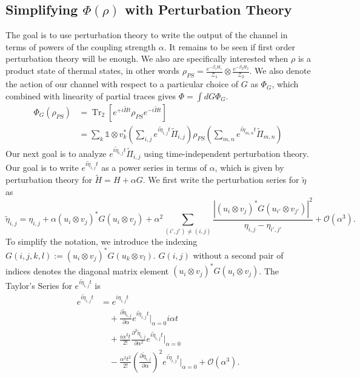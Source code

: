 \documentclass{article}
\newcommand{\parens}[1]{\left( #1 \right)}
\newcommand{\brackets}[1]{\left[ #1 \right]}
\newcommand{\abs}[1]{\left| #1 \right|}
\newcommand{\openone}{\mathds{1}}
\newcommand{\bigo}[1]{\mathcal{O}\left( #1 \right)}
\DeclareMathOperator{\Tr}{Tr}
\newcommand{\partrace}[2]{\Tr_{#1} \brackets{ #2 }}
\newcommand{\partfun}{\mathcal{Z}}
\begin{document}
\subsection{Simplifying $\Phi(\rho)$ with Perturbation Theory}
The goal is to use perturbation theory to write the output of the channel in terms of powers of the coupling strength $\alpha$. It remains to be seen if first order perturbation theory will be enough. We also are specifically interested when $\rho$ is a product state of thermal states, in other words $\rho_{PS} = \frac{e^{-\beta_1 H_1}}{\partfun_1} \otimes \frac{e^{-\beta_2 H_2}}{\partfun_2}$. We also denote the action of our channel with respect to a particular choice of $G$ as $\Phi_G$, which combined with linearity of partial traces gives $\Phi = \int dG \Phi_G$. 
\begin{align}
    \Phi_G(\rho_{PS}) &= \partrace{2}{e^{+i \widetilde{H} t} \rho_{PS} e^{-i \widetilde{H} t}} \\
    &= \sum_{k} \openone \otimes v_k^* \parens{\sum_{i, j} e^{i \widetilde{\eta}_{i, j} t} \widetilde{\Pi}_{i,j}} \rho_{PS} \parens{ \sum_{m, n} e^{i \widetilde{\eta}_{m, n} t} \widetilde{\Pi}_{m,n} }
\end{align}
Our next goal is to analyze $e^{i \widetilde{\eta}_{i,j} t} \widetilde{\Pi}_{i,j}$ using time-independent perturbation theory. Our goal is to write $e^{i \widetilde{\eta}_{i,j} t}$ as a power series in terms of $\alpha$, which is given by perturbation theory for $\widetilde{H} = H + \alpha G$. We first write the perturbation series for $\widetilde{\eta}$ as 
\begin{equation}
    \widetilde{\eta}_{i,j} = \eta_{i,j} + \alpha (u_i \otimes v_j)^* G (u_i \otimes v_j) + \alpha^2 \sum_{(i',j') \neq (i,j)}  \frac{\abs{(u_i \otimes v_j)^* G (u_{i'} \otimes v_{j'})}^{2}}{\eta_{i,j} - \eta_{i',j'}} + \bigo{\alpha^3}.
\end{equation}
To simplify the notation, we introduce the indexing $G(i,j,k,l) := (u_i \otimes v_j)^* G (u_k \otimes v_l)$. $G(i,j)$ without a second pair of indices denotes the diagonal matrix element $(u_i \otimes v_j)^* G (u_i \otimes v_j)$. The Taylor's Series for $e^{i \widetilde{\eta}_{i,j} t}$ is
\begin{align}
    e^{i \widetilde{\eta}_{i,j} t} &= e^{i \eta_{i,j} t} \\
    &\quad + \frac{\partial \widetilde{\eta}_{i,j}}{\partial \alpha} e^{i \widetilde{\eta}_{i,j}t} \bigg|_{\alpha = 0} i \alpha t \\
    &\quad + \frac{ i\alpha^2 t}{2!} \frac{\partial^2 \widetilde{\eta}_{i,j}}{\partial \alpha^2} e^{i \widetilde{\eta}_{i,j}t}\bigg|_{\alpha=0} \\
    &\quad - \frac{\alpha^2 t^2}{2!} \parens{\frac{\partial \widetilde{\eta}_{i,j}}{\partial \alpha}}^2 e^{i \widetilde{\eta}_{i,j} t} \bigg|_{\alpha=0} + \bigo{\alpha^3} .
\end{align}
\end{document}
